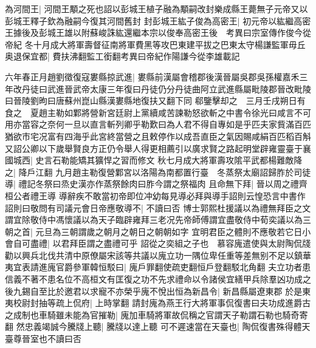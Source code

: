 為河間王|{
	河間王顒之死也詔以彭城王植子融為顒嗣改封樂成縣王薨無子元帝又以彭城王釋子欽為融嗣今復其河間舊封}
封彭城王紘子俊為高密王|{
	初元帝以紘繼高密王據後及彭城王雄以附蘇峻誅紘還繼本宗以俊奉高密王後　考異曰宗室傳作俊今從帝紀}
冬十月成大將軍壽督征南將軍費黑等攻巴東建平拔之巴東太守楊謙監軍毋丘奥退保宜都|{
	費扶沸翻監工銜翻考異曰帝紀作陽謙今從李雄載記}


六年春正月趙劉徵復寇婁縣掠武進|{
	婁縣前漢屬會稽郡後漢晉屬吳郡吳孫權嘉禾三年改丹徒曰武進晉武帝太康三年復曰丹徒仍分丹徒曲阿立武進縣屬毗陵郡晉改毗陵曰晉陵劉昫曰唐蘇州崑山縣漢婁縣地復扶又翻下同}
郗鑒擊却之　三月壬戌朔日有食之　夏趙主勒如鄴將營新宮廷尉上黨續咸苦諫勒怒欲斬之中書令徐光曰咸言不可用亦當容之奈何一旦以直言斬列卿乎勒歎曰為人君不得自專如是乎匹夫家貲滿百匹猶欲市宅况富有四海乎此宮終當營之且敕停作以成吾直臣之氣因賜咸絹百匹稻百斛又詔公卿以下歲舉賢良方正仍令舉人得更相薦引以廣求賢之路起明堂辟雍靈臺于襄國城西|{
	史言石勒能矯其獷悍之習而修文}
秋七月成大將軍壽攻隂平武都楊難敵降之|{
	降戶江翻}
九月趙主勒復營鄴宮以洛陽為南都置行臺　冬蒸祭太廟詔歸胙於司徒導|{
	禮記冬祭曰烝史漢亦作蒸祭餘肉曰胙今謂之祭福肉}
且命無下拜|{
	晉以周之禮齊桓公者禮王導}
導辭疾不敢當初帝即位冲幼每見導必拜與導手詔則云惶恐言中書作詔則曰敬問有司議元會日帝應敬導不|{
	不讀曰否}
博士郭熙杜援議以為禮無拜臣之文謂宜除敬侍中馮懷議以為天子臨辟雍拜三老况先帝師傅謂宜盡敬侍中荀奕議以為三朝之首|{
	元旦為三朝謂歲之朝月之朝日之朝朝如字}
宜明君臣之體則不應敬若它日小會自可盡禮|{
	以君拜臣謂之盡禮可乎}
詔從之奕組之子也　慕容廆遣使與太尉陶侃牋勸以興兵北伐共清中原僚屬宋該等共議以廆立功一隅位卑任重等差無别不足以鎮華夷宜表請進廆官爵參軍韓恒駁曰|{
	廆戶罪翻使疏吏翻恒戶登翻駁北角翻}
夫立功者患信義不著不患名位不高桓文有匡復之功不先求禮命以令諸侯宜繕甲兵除羣凶功成之後九錫自至比於邀君以求寵不亦榮乎廆不悅出恒為新昌令|{
	新昌縣屬遼東郡}
於是東夷校尉封抽等疏上侃府|{
	上時掌翻}
請封廆為燕王行大將軍事侃復書曰夫功成進爵古之成制也車騎雖未能為官摧勒|{
	廆加車騎將軍故侃稱之官謂天子勒謂石勒也騎奇寄翻}
然忠義竭誠今騰牋上聽|{
	騰牋以達上聽}
可不遲速當在天臺也|{
	陶侃復書殊得體天臺尊晉室也不讀曰否}


